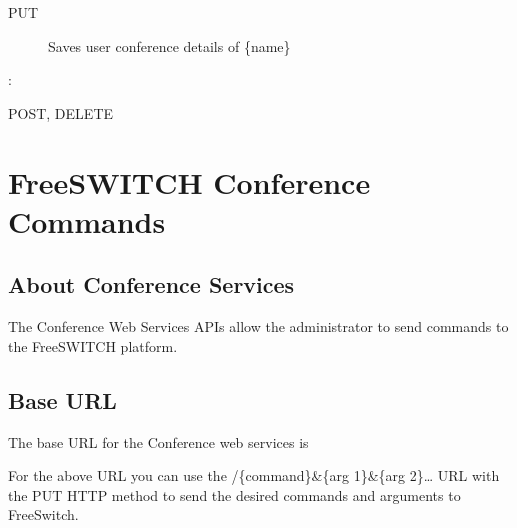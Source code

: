 \documentclass[letterpaper,10pt,english]{sphinxmanual}
\begin{document}
\begin{sphinxVerbatim}[commandchars=\\\{\}]
\end{sphinxVerbatim}
\begin{description}
\item[{ PUT}] \leavevmode
Saves user conference details of \{name\}

\end{description}

:

\begin{sphinxVerbatim}[commandchars=\\\{\}]
\end{sphinxVerbatim}

 POST, DELETE


\section{FreeSWITCH Conference Commands}
\label{\detokenize{restapi:freeswitch-conference-commands}}

\subsection{About Conference Services}
\label{\detokenize{restapi:about-conference-services}}
The Conference Web Services APIs allow the administrator to send commands to the FreeSWITCH platform.


\subsection{Base URL}
\label{\detokenize{restapi:base-url}}
The base URL for the Conference web services is

\begin{sphinxVerbatim}[commandchars=\\\{\}]
\end{sphinxVerbatim}

For the above URL you can use the /\{command\}\&\{arg 1\}\&\{arg 2\}… URL with the PUT HTTP method to send the desired commands and arguments to FreeSwitch.
\end{document}
